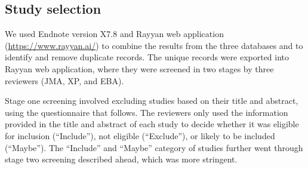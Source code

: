 \documentclass[10pt,letterpaper]{article}
\begin{document}
\subsection*{Study selection}
We used Endnote version X7.8 and Rayyan web application (\url{https://www.rayyan.ai/}) to combine the results from the three databases and to identify and remove duplicate records. The unique records were exported into Rayyan web application, where they were screened in two stages by three reviewers (JMA, XP, and EBA). 

Stage one screening involved excluding studies based on their title and abstract, using the questionnaire that follows. The reviewers only used the information provided in the title and abstract of each study to decide whether it was eligible for inclusion (``Include''), not eligible (``Exclude''), or likely to be included (``Maybe''). The ``Include'' and ``Maybe'' category of studies further went through stage two screening described ahead, which was more stringent. 
\end{document}
